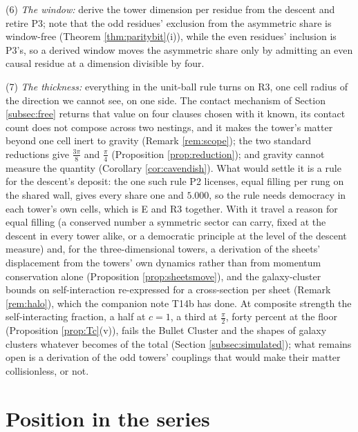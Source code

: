 \documentclass[11pt]{article}
\theoremstyle{definition}
\let\oldsection\section
\renewcommand{\section}{\clearpage\oldsection}   %
\begin{document}
(6) \emph{The window:} derive the tower dimension per residue from the descent and retire P3; note that the odd residues' exclusion from the asymmetric share is window-free (Theorem \ref{thm:paritybit}(i)), while the even residues' inclusion is P3's, so a derived window moves the asymmetric share only by admitting an even causal residue at a dimension divisible by four.

(7) \emph{The thickness:} everything in the unit-ball rule turns on R3, one cell radius of the direction we cannot see, on one side. The contact mechanism of Section \ref{subsec:free} returns that value on four clauses chosen with it known, its contact count does not compose across two nestings, and it makes the tower's matter beyond one cell inert to gravity (Remark \ref{rem:scope}); the two standard reductions give $\tfrac{3\pi}{8}$ and $\tfrac{\pi}{4}$ (Proposition \ref{prop:reduction}); and gravity cannot measure the quantity (Corollary \ref{cor:cavendish}). What would settle it is a rule for the descent's deposit: the one such rule P2 licenses, equal filling per rung on the shared wall, gives every share one and $5.000$, so the rule needs democracy in each tower's own cells, which is E and R3 together. With it travel a reason for equal filling (a conserved number a symmetric sector can carry, fixed at the descent in every tower alike, or a democratic principle at the level of the descent measure) and, for the three-dimensional towers, a derivation of the sheets' displacement from the towers' own dynamics rather than from momentum conservation alone (Proposition \ref{prop:sheetsmove}), and the galaxy-cluster bounds on self-interaction re-expressed for a cross-section per sheet (Remark \ref{rem:halo}), which the companion note T14b has done. At composite strength the self-interacting fraction, a half at $c = 1$, a third at $\tfrac{\pi}{2}$, forty percent at the floor (Proposition \ref{prop:Tc}(v)), fails the Bullet Cluster and the shapes of galaxy clusters whatever becomes of the total (Section \ref{subsec:simulated}); what remains open is a derivation of the odd towers' couplings that would make their matter collisionless, or not.

\section{Position in the series}\label{sec:position}
\end{document}
